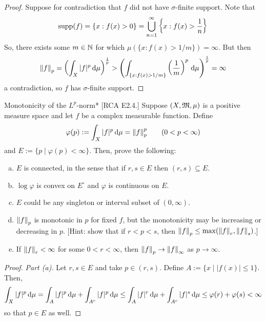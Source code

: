 \begin{proof}
    Suppose for contradiction that \(f\) did not have \(\sigma\)-finite support. Note that 
    \[
        \operatorname{supp}(f) = \{x : f(x) > 0 \} = \bigcup_{n=1}^\infty \left\{ x : f(x) > \frac{1}{n} \right\}
    \]
    So, there exists some \(m \in \mathbb{N}\) for which \(\mu(\{x : f(x) > 1/m\}) = \infty\). But then
    \[
        \norm{f}_p = \left( \int_X |f|^p \, \mathrm{d}\mu \right)^{\frac{1}{p}}
        > \left( \int_{\{x : f(x) > 1/m\}} \left(\frac{1}{m}\right)^p \, \mathrm{d}\mu \right)^{\frac{1}{p}}
        = \infty
    \]
    a contradiction, so \(f\) has \(\sigma\)-finite support. 
\end{proof}


\begin{problem}{Monotonicity of the \(L^p\)-norm}*
    [RCA E2.4.] Suppose \((X, \mathfrak{M}, \mu)\) is a positive measure space and let \(f\) be a complex measurable function. Define 
    \[
        \varphi(p) := \int_X |f|^p \, \mathrm{d}\mu = \norm{f}_p^p
        \qquad (0 < p < \infty) 
    \]
    and \(E := \{ p \mid \varphi(p) < \infty\}\). Then, prove the following: 
    \begin{enumerate}[(a)]
        \itemsep0em
        \item \(E\) is connected, in the sense that if \(r, s \in E\) then \((r, s) \subseteq E\). 
        \item \(\log \varphi\) is convex on \(E^\circ\) and \(\varphi\) is continuous on \(E\). 
        \item \(E\) could be any singleton or interval subset of \((0, \infty)\). 
        \item \(\norm{f}_p\) is monotonic in \(p\) for fixed \(f\), but the monotonicity may be increasing or decreasing in \(p\). [Hint: show that if \(r < p < s\), then \(\norm{f}_p \leq \max(\norm{f}_r, \norm{f}_s)\).]
        \item If \(\norm{f}_r < \infty\) for some \(0 < r < \infty\), then \(\norm{f}_p \to \norm{f}_\infty\) as \(p \to \infty\). 
    \end{enumerate}
\end{problem}

\begin{proof}
    \emph{Part (a).} Let \(r, s \in E\) and take \(p \in (r, s)\). Define \(A := \{ x \mid |f(x)| \leq 1\}\). Then, 
    \[
        \int_X |f|^p \, \mathrm{d} \mu 
        = \int_{A} |f|^p \, \mathrm{d}\mu + \int_{A^c} |f|^p \, \mathrm{d}\mu
        \leq \int_A |f|^r \, \mathrm{d}\mu + \int_{A^c} |f|^s \, \mathrm{d}\mu
        \leq \varphi(r) + \varphi(s) < \infty
    \]
    so that \(p \in E\) as well. 
\end{proof}

